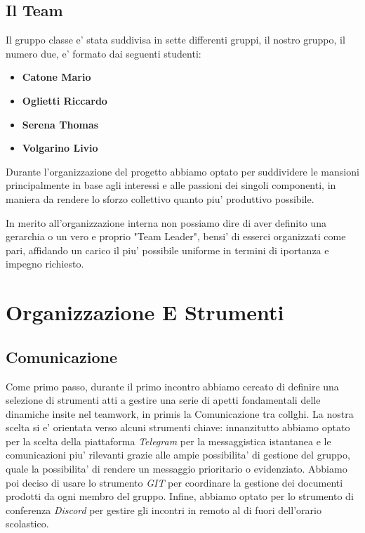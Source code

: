 \documentclass{report}
\begin{document}
        \section{Il Team}
            Il gruppo classe e' stata suddivisa in sette differenti gruppi, il nostro gruppo, il numero due, e' formato dai 
             seguenti studenti:
             \begin{itemize}
                 \item \textbf{Catone Mario}
                 \item \textbf{Oglietti Riccardo}
                 \item \textbf{Serena Thomas}
                 \item \textbf{Volgarino Livio}
             \end{itemize}
            Durante l'organizzazione del progetto abbiamo optato per suddividere le mansioni principalmente in base agli
             interessi e alle passioni dei singoli componenti, in maniera da rendere lo sforzo collettivo quanto piu'
             produttivo possibile. 

            In merito all'organizzazione interna non possiamo dire di aver definito una gerarchia o un vero e proprio 
             "Team Leader", bensi' di esserci organizzati come pari, affidando un carico il piu' possibile uniforme in 
             termini di iportanza e impegno richiesto.

    \chapter{Organizzazione E Strumenti}        
        \section{Comunicazione}
            Come primo passo, durante il primo incontro abbiamo cercato di definire una selezione di strumenti atti a 
             gestire una serie di apetti fondamentali delle dinamiche insite nel teamwork, in primis la Comunicazione
             tra collghi.
            La nostra scelta si e' orientata verso alcuni strumenti chiave: innanzitutto abbiamo optato per la scelta
             della piattaforma \emph{Telegram} per la messaggistica istantanea e le comunicazioni piu' rilevanti grazie
             alle ampie possibilita' di gestione del gruppo, quale la possibilita' di rendere un messaggio prioritario o
             evidenziato. Abbiamo poi deciso di usare lo strumento \emph{GIT} per coordinare la gestione dei documenti
             prodotti da ogni membro del gruppo. Infine, abbiamo optato per lo strumento di conferenza \emph{Discord} per
             gestire gli incontri in remoto al di fuori dell'orario scolastico.
\end{document}
